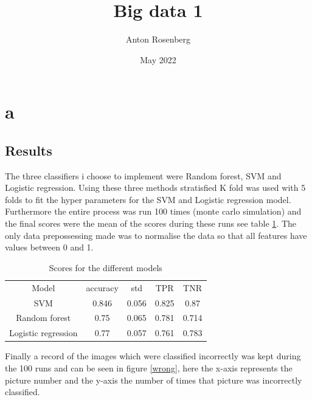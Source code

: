 \documentclass{article}
\title{Big data 1}
\author{Anton Rosenberg}
\date{May 2022}
\begin{document}
\maketitle
\newpage
\section{a}
\subsection{Results}
The three classifiers i choose to implement were Random forest, SVM and Logistic regression. Using these three methods stratisfied K fold was used with 5 folds to fit the hyper parameters for the SVM and Logistic regression model. Furthermore the entire process was run 100 times (monte carlo simulation) and the final scores were the mean of the scores during these runs see table \ref{score}. The only data prepossessing made was to normalise the data so that all features have values between 0 and 1.
\begin{table}[H]
    \centering
    \begin{tabular}{c|c|c|c|c}
        Model & accuracy & std & TPR & TNR \\
         SVM & 0.846 & 0.056 & 0.825 & 0.87 \\
         Random forest & 0.75 & 0.065 & 0.781 & 0.714 \\
         Logistic regression & 0.77 & 0.057 & 0.761 & 0.783
    \end{tabular}
    \caption{Scores for the different models}
    \label{score}
\end{table}
Finally a record of the images which were classified incorrectly was kept during the 100 runs and can be seen in figure \ref{wrong}, here the x-axis represents the picture number and the y-axis the number of times that picture was incorrectly classified.
\end{document}
